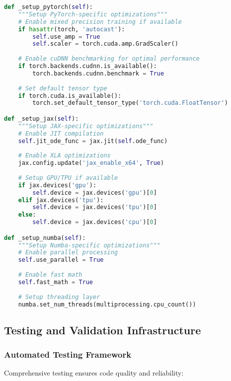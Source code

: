 \begin{lstlisting}[language=Python, caption=Backend-Specific Optimizations]
def _setup_pytorch(self):
    """Setup PyTorch-specific optimizations"""
    # Enable mixed precision training if available
    if hasattr(torch, 'autocast'):
        self.use_amp = True
        self.scaler = torch.cuda.amp.GradScaler()
    
    # Enable cuDNN benchmarking for optimal performance
    if torch.backends.cudnn.is_available():
        torch.backends.cudnn.benchmark = True
    
    # Set default tensor type
    if torch.cuda.is_available():
        torch.set_default_tensor_type('torch.cuda.FloatTensor')

def _setup_jax(self):
    """Setup JAX-specific optimizations"""
    # Enable JIT compilation
    self.jit_ode_func = jax.jit(self.ode_func)
    
    # Enable XLA optimizations
    jax.config.update('jax_enable_x64', True)
    
    # Setup GPU/TPU if available
    if jax.devices('gpu'):
        self.device = jax.devices('gpu')[0]
    elif jax.devices('tpu'):
        self.device = jax.devices('tpu')[0]
    else:
        self.device = jax.devices('cpu')[0]

def _setup_numba(self):
    """Setup Numba-specific optimizations"""
    # Enable parallel processing
    self.use_parallel = True
    
    # Enable fast math
    self.fast_math = True
    
    # Setup threading layer
    numba.set_num_threads(multiprocessing.cpu_count())
\end{lstlisting}

\subsection{Testing and Validation Infrastructure}

\subsubsection{Automated Testing Framework}

Comprehensive testing ensures code quality and reliability:

